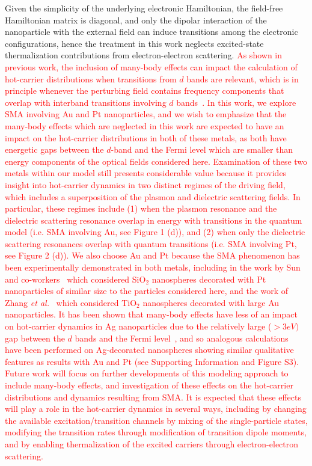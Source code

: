 \documentclass[journal=jpclcd,manuscript=article]{achemso}
\begin{document}
Given the simplicity of the underlying electronic Hamiltonian, the field-free Hamiltonian matrix is diagonal, and only the dipolar
interaction of the nanoparticle with the external field can induce transitions among the electronic configurations, hence the treatment in 
this work neglects excited-state thermalization contributions from electron-electron scattering.  
\textcolor{red}{As shown in previous work, the inclusion of many-body effects can impact the calculation
of hot-carrier distributions when transitions from $d$ bands are relevant, which is in principle whenever the perturbing
field contains frequency components that overlap with interband transitions involving $d$ bands~\cite{MLK_ACSNano_2014,BMN_NatComm_2015, Atwater_Review}.  
In this work, we explore SMA involving Au and Pt nanoparticles, and we wish to emphasize that the many-body effects 
which are neglected in this work are expected to have an impact on the hot-carrier distributions in both of these metals, 
as both have energetic gaps between the $d$-band and the Fermi level which are smaller than energy components of the optical fields
considered here.  Examination of these two metals within our model still presents considerable value because it provides
insight into hot-carrier dynamics in two distinct regimes of the driving field, which includes a superposition
of the plasmon and dielectric scattering fields.  In particular, these regimes include (1) when the plasmon 
resonance and the dielectric scattering resonance overlap in energy with transitions in the quantum model 
(i.e. SMA involving Au, see Figure 1 (d)), 
and (2) when only the dielectric scattering resonances overlap with 
quantum transitions (i.e. SMA involving Pt, see Figure 2 (d)).   
We also choose Au and Pt because the SMA phenomenon
has been experimentally demonstrated in both metals, including in the work by Sun and co-workers~\cite{ZHX_NatPhoton_2016} which
considered SiO$_2$ nanospheres decorated with Pt nanoparticles of similar size to the particles considered here, and the work of 
Zhang {\it et al.}~\cite{ZJM_ACSNano_2016} which considered
TiO$_2$ nanospheres decorated with large Au nanoparticles.  It has been shown that many-body effects have less of an impact
on hot-carrier dynamics in Ag nanoparticles due to the relatively large ($> 3eV)$ gap between the $d$ bands and the Fermi level~\cite{MLK_ACSNano_2014,Atwater_Review}, and so
analogous calculations have been performed on Ag-decorated nanospheres showing similar qualitative features
as results with Au and Pt (see Supporting Information and Figure S3).
  Future work will focus on further developments of this modeling approach to include
many-body effects, and investigation of these effects on the hot-carrier distributions and dynamics resulting from SMA.  It is expected
that these effects will play a role in the hot-carrier dynamics in several ways, including by changing the available excitation/transition channels
by mixing of the single-particle states, modifying the transition rates through modification of transition dipole moments, and by enabling
thermalization of the excited carriers through electron-electron scattering.}
\end{document}
